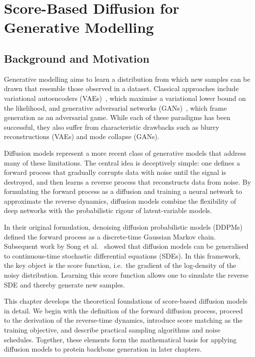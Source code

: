 \documentclass[a4paper,12pt]{article}
\begin{document}
\section{Score-Based Diffusion for Generative Modelling}\label{sec:SBD}
\subsection{Background and Motivation}
Generative modelling aims to learn a distribution from which new samples can be drawn that resemble those observed in a dataset. Classical approaches include variational autoencoders (VAEs)~\cite{kingma2022AutoEncodingVariationalBayes}, which maximise a variational lower bound on the likelihood, and generative adversarial networks (GANs)~\cite{goodfellow2020GenerativeAdversarialNetworks}, which frame generation as an adversarial game. While each of these paradigms has been successful, they also suffer from characteristic drawbacks such as blurry reconstructions (VAEs) and mode collapse (GANs).

Diffusion models represent a more recent class of generative models that address many of these limitations. The central idea is deceptively simple: one defines a forward process that gradually corrupts data with noise until the signal is destroyed, and then learns a reverse process that reconstructs data from noise. By formulating the forward process as a diffusion and training a neural network to approximate the reverse dynamics, diffusion models combine the flexibility of deep networks with the probabilistic rigour of latent-variable models. 

In their original formulation, denoising diffusion probabilistic models (DDPMs)~\cite{hoDenoisingDiffusionProbabilistic2020} defined the forward process as a discrete-time Gaussian Markov chain. Subsequent work by Song et al.~\cite{song2020score} showed that diffusion models can be generalised to continuous-time stochastic differential equations (SDEs). In this framework, the key object is the score function, i.e.~the gradient of the log-density of the noisy distribution. Learning this score function allows one to simulate the reverse SDE and thereby generate new samples.

This chapter develops the theoretical foundations of score-based diffusion models in detail. We begin with the definition of the forward diffusion process, proceed to the derivation of the reverse-time dynamics, introduce score matching as the training objective, and describe practical sampling algorithms and noise schedules. Together, these elements form the mathematical basis for applying diffusion models to protein backbone generation in later chapters.
\end{document}
